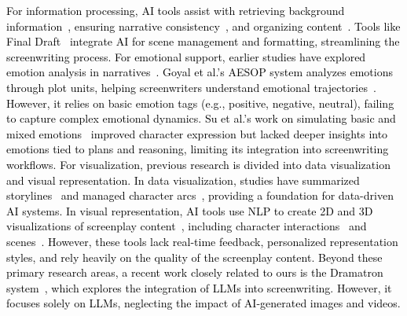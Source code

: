 
\textcolor{black}{For information processing, AI tools assist with retrieving background information~\cite{pavel2015sceneskim}, ensuring narrative consistency~\cite{sanghrajka2017lisa, kapadia2015computer}, and organizing content~\cite{valls2016error, mateas2003experiment}. Tools like Final Draft~\cite{finaldraft} integrate AI for scene management and formatting, streamlining the screenwriting process. For emotional support, earlier studies have explored emotion analysis in narratives~\cite{stapleton2003interactive}. Goyal et al.'s AESOP system analyzes emotions through plot units, helping screenwriters understand emotional trajectories~\cite{goyal2010toward}. However, it relies on basic emotion tags (e.g., positive, negative, neutral), failing to capture complex emotional dynamics. Su et al.'s work on simulating basic and mixed emotions~\cite{su2007personality} improved character expression but lacked deeper insights into emotions tied to plans and reasoning, limiting its integration into screenwriting workflows. For visualization, previous research is divided into data visualization and visual representation. In data visualization, studies have summarized storylines~\cite{tapaswi2014storygraphs} and managed character arcs~\cite{kim2017visualizing}, providing a foundation for data-driven AI systems. In visual representation, AI tools use NLP to create 2D and 3D visualizations of screenplay content~\cite{10.1145/3172944.3172972, kim2017visualizing}, including character interactions~\cite{won2014generating} and scenes~\cite{hanser2009scenemaker}. However, these tools lack real-time feedback, personalized representation styles, and rely heavily on the quality of the screenplay content. Beyond these primary research areas, a recent work closely related to ours is the Dramatron system~\cite{10.1145/3544548.3581225}, which explores the integration of LLMs into screenwriting. However, it focuses solely on LLMs, neglecting the impact of AI-generated images and videos.}

